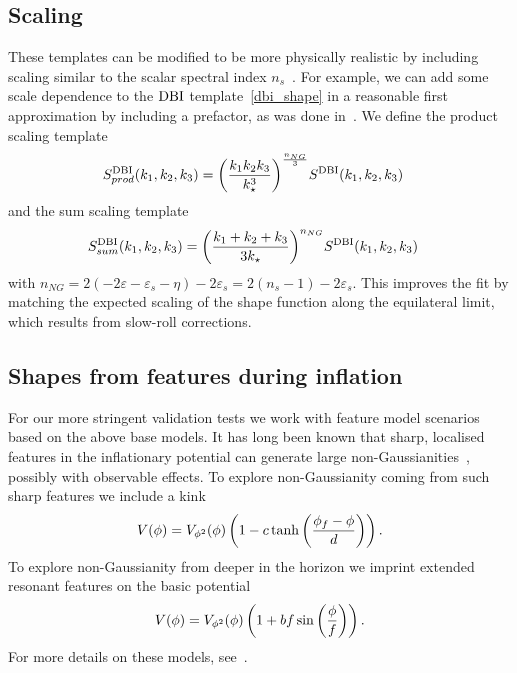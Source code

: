     \subsection{Scaling}
These templates can be modified to be more physically realistic by including
scaling similar to the scalar spectral index $n_s$~\cite{Planck_NG_2015}.
For example, we can add some scale dependence to the $\text{DBI}$ template~\eqref{dbi_shape}
in a reasonable first approximation by including a prefactor,
as was done in~\cite{Planck_NG_2013}.
We define the product scaling template
\begin{align}\label{dbi_prod_shape}
    S^{\text{DBI}}_{prod}(k_1,k_2,k_3) &= {\left(\frac{k_1k_2k_3}{k^3_\star}\right)}^{\frac{n_{NG}}{3}}S^{\text{DBI}}(k_1,k_2,k_3)
\end{align}
and the sum scaling template
\begin{align}\label{dbi_sum_shape}
    S^{\text{DBI}}_{sum}(k_1,k_2,k_3) &= {\left(\frac{k_1+k_2+k_3}{3k_\star}\right)}^{n_{NG}}S^{\text{DBI}}(k_1,k_2,k_3)
\end{align}
with $n_{NG}=2(-2\varepsilon-\varepsilon_s-\eta)-2\varepsilon_s=2(n_s-1)-2\varepsilon_s$.
This improves the fit by matching the expected scaling of the shape function
along the equilateral limit, which results from slow-roll corrections.


\subsection{Shapes from features during inflation}
For our more stringent validation tests we work with feature model scenarios
based on the above base models.
It has long been known that sharp, localised features in the inflationary potential
can generate large non-Gaussianities~\cite{chen_easther_lim_1}, possibly with observable effects.
To explore non-Gaussianity coming from such sharp features we include
a kink~\cite{Adams_step}
\begin{align}\label{eq:kink_potential}
    V(\phi) = V_{\phi^2}(\phi)\left(1-c\tanh\left(\frac{\phi_f-\phi}{d}\right)\right).
\end{align}
To explore non-Gaussianity from deeper in the horizon we imprint
extended resonant features on the basic potential
\begin{align}\label{eq:resonant_potential}
    V(\phi) = V_{\phi^2}(\phi)\left(1+bf\sin\left(\frac{\phi}{f}\right)\right).
\end{align}
For more details on these models, see~\cite{chen_easther_lim_2}.


